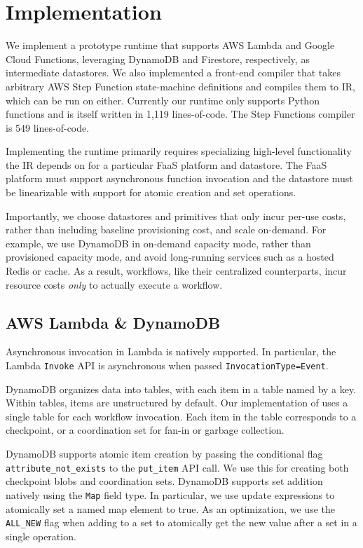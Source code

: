 \section{Implementation}\label{sec:impl}

We implement a prototype \name{} runtime that supports AWS Lambda and Google
Cloud Functions, leveraging DynamoDB and Firestore, respectively, as
intermediate datastores. We also implemented a front-end compiler that takes
arbitrary AWS Step Function state-machine definitions and compiles them to
\name{} IR, which can be run on either. Currently our runtime only supports
Python functions and is itself written in 1,119 lines-of-code. The Step
Functions compiler is 549 lines-of-code.

Implementing the runtime primarily requires specializing high-level
functionality the IR depends on for a particular FaaS platform and datastore.
The FaaS platform must support asynchronous function invocation and the
datastore must be linearizable with support for atomic creation and set
operations.

Importantly, we choose datastores and primitives that only incur per-use costs,
rather than including baseline provisioning cost, and scale on-demand. For
example, we use DynamoDB in on-demand capacity mode, rather than provisioned
capacity mode, and avoid long-running services such as a hosted Redis or cache.
As a result, \name{} workflows, like their centralized counterparts, incur
resource costs \emph{only} to actually execute a workflow.

\subsection{AWS Lambda \& DynamoDB}

Asynchronous invocation in Lambda is natively supported. In particular, the
Lambda \texttt{Invoke} API is asynchronous when passed \texttt{InvocationType=Event}.

DynamoDB organizes data into tables, with each item in a table named by a key.
Within tables, items are unstructured by default. Our implementation of \name{}
uses a single table for each workflow invocation. Each item in the table
corresponds to a checkpoint, or a coordination set for fan-in or garbage
collection.

DynamoDB supports atomic item creation by passing the conditional flag
\texttt{attribute\_not\_exists} to the \texttt{put\_item} API call. We use this
for creating both checkpoint blobs and coordination sets. DynamoDB supports set
addition natively using the \texttt{Map} field type. In particular, we use
update expressions to atomically set a named map element to true.  As an
optimization, we use the \texttt{ALL\_NEW} flag when adding to a set to
atomically get the new value after a set in a single operation.

